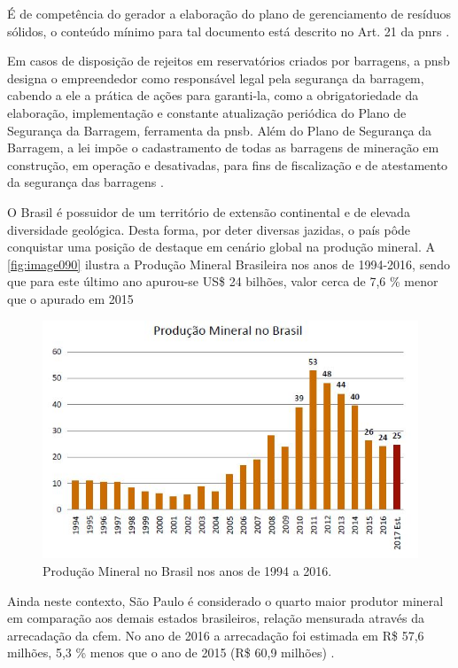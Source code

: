 É de competência do gerador a elaboração do plano de gerenciamento de resíduos sólidos, o conteúdo mínimo para tal documento está descrito no Art. 21 da \gls{pnrs} \cite{brasil:12305}.

Em casos de disposição de rejeitos em reservatórios criados por barragens, a \gls{pnsb} designa o empreendedor como responsável legal pela segurança da barragem, cabendo a ele a prática de ações para garanti-la, como a obrigatoriedade da elaboração, implementação e constante atualização periódica do Plano de Segurança da Barragem, ferramenta da \gls{pnsb}. Além do Plano de Segurança da Barragem, a lei impõe o cadastramento de todas as barragens de mineração em construção, em operação e desativadas, para fins de fiscalização e de atestamento da segurança das barragens \cite{brasil:12334}.

O Brasil é possuidor de um território de extensão continental e de elevada diversidade geológica. Desta forma, por deter diversas jazidas, o país pôde conquistar uma posição de destaque em cenário global na produção mineral. A \autoref{fig:image090} ilustra a Produção Mineral Brasileira nos anos de 1994-2016, sendo que para este último ano apurou-se US\$ 24 bilhões, valor cerca de 7,6 \% menor que o apurado em 2015 %

\begin{figure}
	\centering
	\includegraphics[width=0.75\linewidth]{produtos/prodtres/image090}
	\caption{Produção Mineral no Brasil nos anos de 1994 a 2016.}
	\label{fig:image090}
\end{figure}


Ainda neste contexto, São Paulo é considerado o quarto maior produtor mineral em comparação aos demais estados brasileiros, relação mensurada através da arrecadação da \gls{cfem}. No ano de 2016 a arrecadação foi estimada em R\$ 57,6 milhões, 5,3 \% menos que o ano de 2015 (R\$ 60,9 milhões) \cite{informe2016}.

